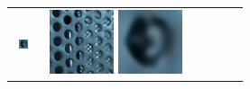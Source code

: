 \begin{figure}[ht!]
{\begin{tabular}{cccccc}
\begin{minipage}{0.180\textwidth}
            \includegraphics[width=0.46\textwidth, height=0.46\textwidth,cfbox=red 1pt 0pt]{img/qual/Perforated_Metal_3/LFT/SR.LAM.png}
        \end{minipage} &
        \begin{minipage}{0.180\textwidth}
            \centering
            \includegraphics[width=0.46\textwidth, height=0.46\textwidth,cfbox=blue 1pt 0pt]{img/qual/Perforated_Metal_3/EPIT/SR.png}
            \includegraphics[width=0.46\textwidth, height=0.46\textwidth,cfbox=red 1pt 0pt]{img/qual/Perforated_Metal_3/EPIT/SR.LAM.png}
        \end{minipage} &
        \begin{minipage}{0.180\textwidth}
            \centering

\end{minipage}
\end{tabular}}
\end{figure}
